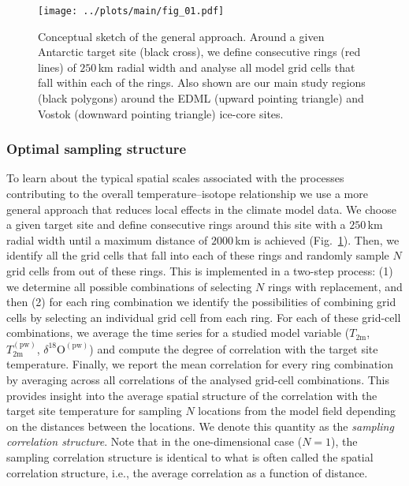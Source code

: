 \documentclass[cp, manuscript]{copernicus}
\begin{document}
\begin{figure}[t]%
\centering
\texttt{[image: ../plots/main/fig\_01.pdf]}
\caption[Conceptual approach]{%
  Conceptual sketch of the general approach. Around a given Antarctic target
  site (black cross), we define consecutive rings (red lines) of $250$\,km
  radial width and analyse all model grid cells that fall within each of the
  rings. Also shown are our main study regions (black polygons) around the EDML
  (upward pointing triangle) and Vostok (downward pointing triangle) ice-core
  sites.}
\label{fig:concept}%
\end{figure}%

\subsubsection{Optimal sampling structure}\label{methods:opt.sampling}

To learn about the typical spatial scales associated with the processes
contributing to the overall temperature--isotope relationship we use a more
general approach that reduces local effects in the climate model data. We choose
a given target site and define consecutive rings around this site with a
$250$\,km radial width until a maximum distance of $2000$\,km is achieved
(Fig.~\ref{fig:concept}). Then, we identify all the grid cells that fall into
each of these rings and randomly sample $N$ grid cells from out of these
rings. This is implemented in a two-step process: (1) we determine all possible
combinations of selecting $N$ rings with replacement, and then (2) for each
ring combination we identify the possibilities of combining grid cells by
selecting an individual grid cell from each ring. For each of these grid-cell
combinations, we average the time series for a studied model variable
($T_{2\mathrm{m}}$, $T_{2\mathrm{m}}^{\mathrm{(pw)}}$,
$\delta^{18}\mathrm{O}^{\mathrm{(pw)}}$) and compute the degree of correlation
with the target site temperature. Finally, we report the mean correlation for
every ring combination by averaging across all correlations of the analysed
grid-cell combinations. This provides insight into the average spatial structure
of the correlation with the target site temperature for sampling $N$ locations
from the model field depending on the distances between the locations. We denote
this quantity as the \emph{sampling correlation structure}. Note that in the
one-dimensional case ($N=1$), the sampling correlation structure is identical to
what is often called the spatial correlation structure, i.e., the average
correlation as a function of distance.
\end{document}
